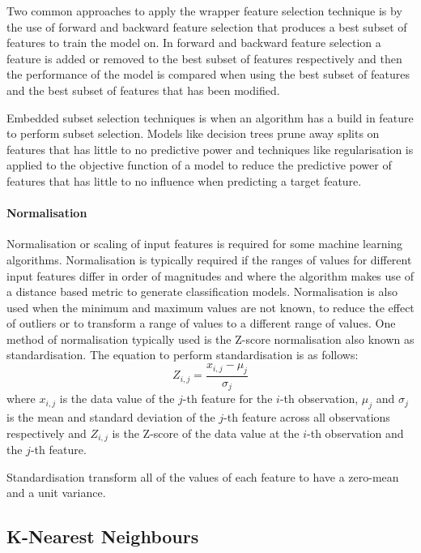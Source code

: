 \documentclass[10pt, conference]{IEEEtran}
\begin{document}
Two common approaches to apply the wrapper feature selection technique is by the use of forward and backward
feature selection that produces a best subset of features to train the model on. In forward and backward feature
selection a feature is added or removed to the best subset of features respectively and then the performance
of the model is compared when using the best subset of features and the best subset of features that has been
modified.

Embedded subset selection techniques is when an algorithm has a build in feature to perform subset selection.
Models like decision trees prune away splits on features that has little to no predictive power and techniques
like regularisation is applied to the objective function of a model to reduce the predictive
power of features that has little to no influence when predicting a target feature.

\paragraph{Normalisation}

Normalisation or scaling of input features is required for some machine learning algorithms. Normalisation
is typically required if the ranges of values for different input features differ in order of magnitudes 
and where the algorithm makes use of a distance based metric to generate classification
models. Normalisation is also used when the minimum and maximum values are not known, to
reduce the effect of outliers or to transform a range of values to a different range of values. One method
of normalisation typically used is the Z-score normalisation also known as standardisation. The equation to
perform standardisation is as follows:
\begin{equation}
    Z_{i,j} = \frac{x_{i,j} - \mu_j}{\sigma_j} \label{standardisation}
\end{equation}
where $x_{i,j}$ is the data value of the $j$-th feature for the $i$-th observation, $\mu_j$ and $\sigma_j$
is the mean and standard deviation of the $j$-th feature across all observations respectively and $Z_{i,j}$
is the Z-score of the data value at the $i$-th observation and the $j$-th feature.

Standardisation transform all of the values of each feature to have a zero-mean and a unit variance.

\subsection{K-Nearest Neighbours}\label{KNN_background}
\end{document}
